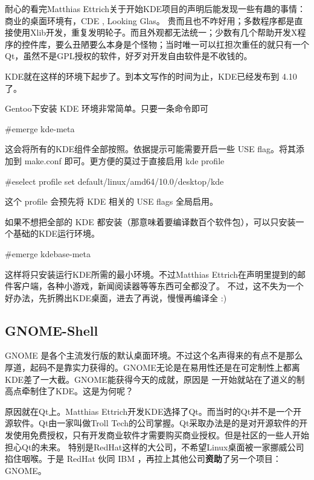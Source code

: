 耐心的看完{}Matthias Ettrich{}关于开始KDE项目的声明后能发现一些有趣的事情：
商业的桌面环境有，CDE , Looking Glas。 贵而且也不咋好用；多数程序都是直接使用Xlib开发，重复发明轮子。而且外观都无法统一；少数有几个帮助开发X程序的控件库，要么丑陋要么本身是个怪物；当时唯一可以扛担次重任的就只有一个Qt，虽然不是GPL授权的软件，好歹对开发自由软件是不收钱的。

KDE就在这样的环境下起步了。到本文写作的时间为止，KDE已经发布到 4.10了。

Gentoo下安装 KDE 环境非常简单。只要一条命令即可

\begin{code}
\#emerge kde-meta
\end{code}

这会将所有的KDE组件全部按照。依据提示可能需要开启一些 USE flag。将其添加到 make.conf 即可。更方便的莫过于直接启用 kde profile

\begin{code}
\#eselect profile  set default/linux/amd64/10.0/desktop/kde
\end{code}

这个 profile 会预先将 KDE 相关的 USE flags 全局启用。

如果不想把全部的 KDE 都安装（那意味着要编译数百个软件包），可以只安装一个基础的KDE运行环境。 

\begin{code}
\#emerge kdebase-meta
\end{code}

这样将只安装运行KDE所需的最小环境。不过{}Matthias Ettrich{}在声明里提到的邮件客户端，各种小游戏，新闻阅读器等等东西可全都没了。
不过，这不失为一个好办法，先折腾出KDE桌面，进去了再说，慢慢再编译全 :) 


\subsection{GNOME-Shell}

GNOME 是各个主流发行版的默认桌面环境。不过这个名声得来的有点不是那么厚道，起码不是靠实力获得的。GNOME无论是在易用性还是在可定制性上都离KDE差了一大截。GNOME能获得今天的成就，原因是
一开始就站在了道义的制高点牵制住了KDE。这是为何呢？

原因就在Qt上。{}Matthias Ettrich{}开发KDE选择了Qt。而当时的Qt并不是一个开源软件。Qt由一家叫做Troll Tech的公司掌握。Qt采取办法是的是对开源软件的开发使用免费授权，只有开发商业软件才需要购买商业授权。但是社区的一些人开始担心Qt的未来。
特别是RedHat这样的大公司，不希望Linux桌面被一家挪威公司掐住咽喉。于是 RedHat 伙同 IBM ，再拉上其他公司\textbf{资助}了另一个项目：GNOME。

